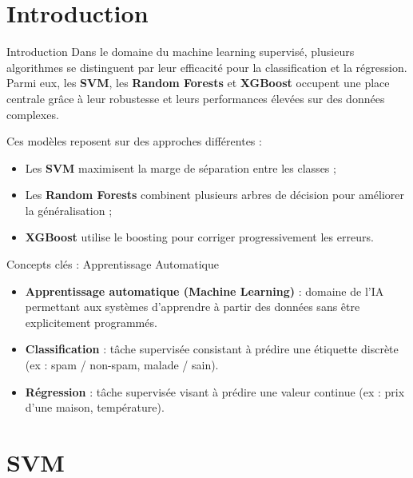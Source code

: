 \documentclass[11pt]{beamer}
\begin{document}
\section{Introduction}
\begin{frame}{Introduction}
Dans le domaine du machine learning supervisé, plusieurs algorithmes se distinguent par leur efficacité pour la classification et la régression. Parmi eux, les \textbf{SVM}, les \textbf{Random Forests} et \textbf{XGBoost} occupent une place centrale grâce à leur robustesse et leurs performances élevées sur des données complexes.

\medskip
Ces modèles reposent sur des approches différentes :
\begin{itemize}
    \item Les \textbf{SVM} maximisent la marge de séparation entre les classes ;
    \item Les \textbf{Random Forests} combinent plusieurs arbres de décision pour améliorer la généralisation ;
    \item \textbf{XGBoost} utilise le boosting pour corriger progressivement les erreurs.
\end{itemize}
\end{frame}

\begin{frame}{Concepts clés : Apprentissage Automatique}
\begin{itemize}
    \item \textbf{Apprentissage automatique (Machine Learning)} : domaine de l'IA permettant aux systèmes d'apprendre à partir des données sans être explicitement programmés.
    
    \medskip
    \item \textbf{Classification} : tâche supervisée consistant à prédire une étiquette discrète (ex : spam / non-spam, malade / sain).
    
    \medskip
    \item \textbf{Régression} : tâche supervisée visant à prédire une valeur continue (ex : prix d'une maison, température).
\end{itemize}
\end{frame}


\section{SVM}
\end{document}
